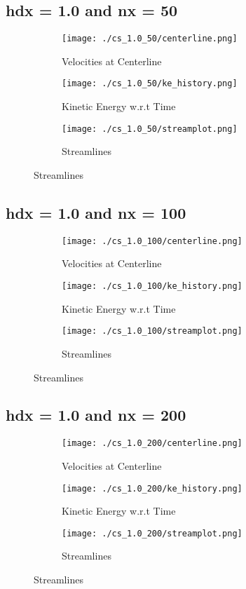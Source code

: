 \documentclass[12pt, a4paper]{report}
\begin{document}
\subsection{hdx = 1.0 and nx = 50}
\begin{figure}[H]
\begin{subfigure}{0.5\textwidth}
	\texttt{[image: ./cs\_1.0\_50/centerline.png]}
	\caption{Velocities at Centerline}
\end{subfigure}
\begin{subfigure}{0.5\textwidth}
	\texttt{[image: ./cs\_1.0\_50/ke\_history.png]}
	\caption{Kinetic Energy w.r.t Time}
\end{subfigure}
\medskip
\begin{subfigure}{\textwidth}
	\centering
	\texttt{[image: ./cs\_1.0\_50/streamplot.png]}
	\caption{Streamlines}
\end{subfigure}
\end{figure}

\subsection{hdx = 1.0 and nx = 100}
\begin{figure}[H]
\begin{subfigure}{0.5\textwidth}
	\texttt{[image: ./cs\_1.0\_100/centerline.png]}
	\caption{Velocities at Centerline}
\end{subfigure}
\begin{subfigure}{0.5\textwidth}
	\texttt{[image: ./cs\_1.0\_100/ke\_history.png]}
	\caption{Kinetic Energy w.r.t Time}
\end{subfigure}
\medskip
\begin{subfigure}{\textwidth}
	\texttt{[image: ./cs\_1.0\_100/streamplot.png]}
	\caption{Streamlines}
\end{subfigure}
\end{figure}

\subsection{hdx = 1.0 and nx = 200}
\begin{figure}[H]
\begin{subfigure}{0.5\textwidth}
	\texttt{[image: ./cs\_1.0\_200/centerline.png]}
	\caption{Velocities at Centerline}
\end{subfigure}
\begin{subfigure}{0.5\textwidth}
	\texttt{[image: ./cs\_1.0\_200/ke\_history.png]}
	\caption{Kinetic Energy w.r.t Time}
\end{subfigure}
\medskip
\begin{subfigure}{\textwidth}
	\texttt{[image: ./cs\_1.0\_200/streamplot.png]}
	\caption{Streamlines}
\end{subfigure}
\end{figure}
\end{document}
